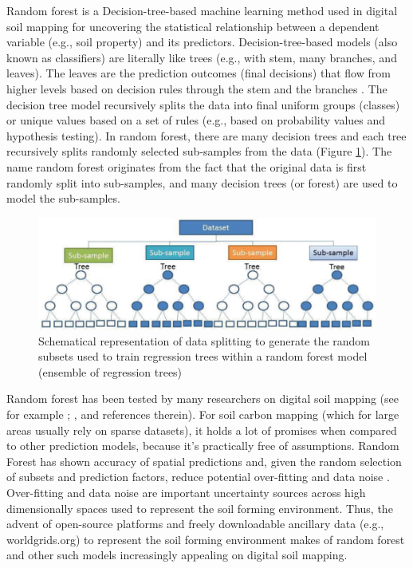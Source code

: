 \documentclass[10pt,b5paper,]{book}
\theoremstyle{definition}
\theoremstyle{definition}
\theoremstyle{definition}
\theoremstyle{remark}
\begin{document}
Random forest is a Decision-tree-based machine learning method used in
digital soil mapping for uncovering the statistical relationship between
a dependent variable (e.g., soil property) and its predictors.
Decision-tree-based models (also known as classifiers) are literally
like trees (e.g., with stem, many branches, and leaves). The leaves are
the prediction outcomes (final decisions) that flow from higher levels
based on decision rules through the stem and the branches
\citep{breiman1984classification}. The decision tree model recursively
splits the data into final uniform groups (classes) or unique values
based on a set of rules (e.g., based on probability values and
hypothesis testing). In random forest, there are many decision trees and
each tree recursively splits randomly selected sub-samples from the data
(Figure \ref{fig:rfschema}). The name random forest originates from the
fact that the original data is first randomly split into sub-samples,
and many decision trees (or forest) are used to model the sub-samples.

\begin{figure}

{\centering \includegraphics[width=0.8\linewidth]{images/randomForestconcept} 

}

\caption{Schematical representation of data splitting to generate the random subsets used to train regression trees within a random forest model (ensemble of regression trees)}\label{fig:rfschema}
\end{figure}

Random forest has been tested by many researchers on digital soil
mapping (see for example \citet{poggio2013regional};
\citet{rad2014updating}, and references therein). For soil carbon
mapping (which for large areas usually rely on sparse datasets), it
holds a lot of promises when compared to other prediction models,
because it's practically free of assumptions. Random Forest has shown
accuracy of spatial predictions and, given the random selection of
subsets and prediction factors, reduce potential over-fitting and data
noise \citep{wiesmeier2011digital}. Over-fitting and data noise are
important uncertainty sources across high dimensionally spaces used to
represent the soil forming environment. Thus, the advent of open-source
platforms and freely downloadable ancillary data (e.g., worldgrids.org)
to represent the soil forming environment makes of random forest and
other such models increasingly appealing on digital soil mapping.
\end{document}
